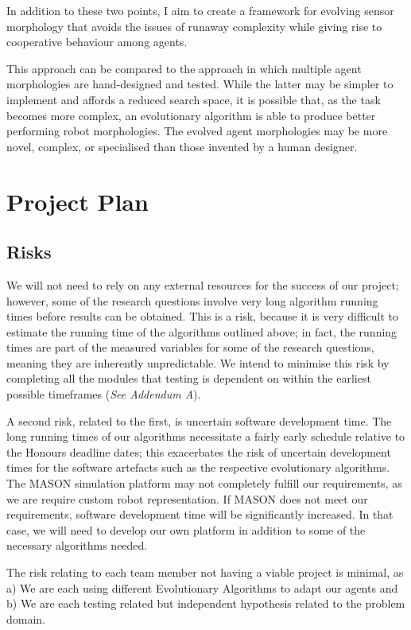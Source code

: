 \documentclass[a4paper,12pt]{article}
\begin{document}
In addition to these two points, I aim to create a framework for evolving sensor morphology that avoids the issues of runaway complexity while giving rise to cooperative behaviour among agents.

This approach can be compared to the approach in which multiple agent morphologies are hand-designed and tested. While the latter may be simpler to implement and affords a reduced search space, it is possible that, as the task becomes more complex, an evolutionary algorithm is able to produce better performing robot morphologies. The evolved agent morphologies may be more novel, complex, or specialised than those invented by a human designer.

\section{Project Plan}

\subsection{Risks}
We will not need to rely on any external resources for the success of our project; however, some of the research questions involve very long algorithm running times before results can be obtained. This is a risk, because it is very difficult to estimate the running time of the algorithms outlined above; in fact, the running times are part of the measured variables for some of the research questions, meaning they are inherently unpredictable. We intend to minimise this risk by completing all the modules that testing is dependent on within the earliest possible timeframes (\textit{See Addendum A}).

A second risk, related to the first, is uncertain software development time. The long running times of our algorithms necessitate a fairly early schedule relative to the Honours deadline dates; this exacerbates the risk of uncertain development times for the software artefacts such as the respective evolutionary algorithms. The MASON simulation platform may not completely fulfill our requirements, as we are require custom robot representation. If MASON does not meet our requirements, software development time will be significantly increased. In that case, we will need to develop our own platform in addition to some of the necessary algorithms needed.

The risk relating to each team member not having a viable project is minimal, as a) We are each using different Evolutionary Algorithms to adapt our agents and b) We are each testing related but independent hypothesis related to the problem domain.
\end{document}
